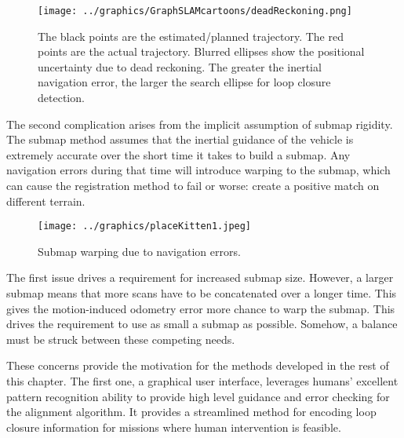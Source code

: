  \begin{figure}[htbp]
   \centering
   \texttt{[image: ../graphics/GraphSLAMcartoons/deadReckoning.png]} %
   \caption{The black points are the estimated/planned trajectory. The red points are the actual trajectory. Blurred ellipses show the positional uncertainty due to dead reckoning. The greater the inertial navigation error, the larger the search ellipse for loop closure detection.  }
   \label{fig:BathyMapping2}
\end{figure}


The second complication arises from the implicit assumption of submap rigidity. The submap method assumes that the inertial guidance of the vehicle is extremely accurate over the short time it takes to build a submap. Any navigation errors during that time will introduce warping to the submap, which can cause the registration method to fail or worse: create a positive match on different terrain. 

 \begin{figure}[htbp]
   \centering
   \texttt{[image: ../graphics/placeKitten1.jpeg]} %
   \caption{Submap warping due to navigation errors.}
   \label{fig:BathyMapping2}
\end{figure}

The first issue drives a requirement for increased submap size. However, a larger submap means that more scans have to be concatenated over a longer time. This gives the motion-induced odometry error more chance to warp the submap. This drives the requirement to use as small a submap as possible. Somehow, a balance must be struck between these competing needs. 


These concerns provide the motivation for the methods developed in the rest of this chapter. The first one, a graphical user interface, leverages humans' excellent pattern recognition ability to provide high level guidance and error checking for the alignment algorithm. It provides a streamlined method for encoding loop closure information for missions where human intervention is feasible. 

